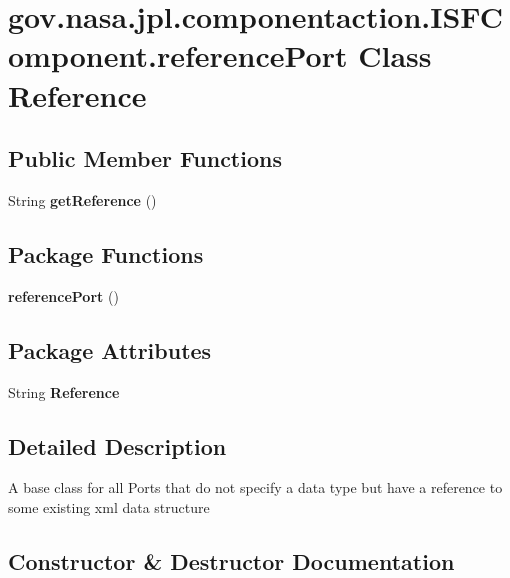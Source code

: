 \section{gov.\+nasa.\+jpl.\+componentaction.\+I\+S\+F\+Component.\+reference\+Port Class Reference}
\label{classgov_1_1nasa_1_1jpl_1_1componentaction_1_1_i_s_f_component_1_1reference_port}
\subsection*{Public Member Functions}
\begin{DoxyCompactItemize}
\item 
String {\bf get\+Reference} ()
\end{DoxyCompactItemize}
\subsection*{Package Functions}
\begin{DoxyCompactItemize}
\item 
{\bf reference\+Port} ()
\end{DoxyCompactItemize}
\subsection*{Package Attributes}
\begin{DoxyCompactItemize}
\item 
String {\bf Reference}
\end{DoxyCompactItemize}


\subsection{Detailed Description}
A base class for all Ports that do not specify a data type but have a reference to some existing xml data structure 

\subsection{Constructor \& Destructor Documentation}
